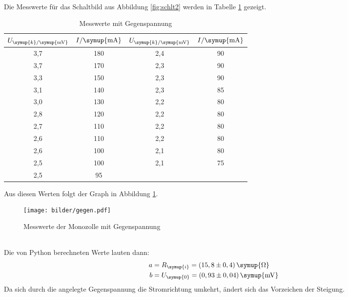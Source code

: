 \newpage
Die Messwerte für das Schaltbild aus Abbildung \ref{fig:schlt2} werden in
Tabelle \ref{tab:ggn} gezeigt.
\begin{table}[H]
  \centering
  \begin{tabular}{c c c c}
    \toprule
    $U_{\symup{k}/\symup{\si{\milli\volt}}}$ & $I/\symup{\si{\milli\ampere}}$  &
    $U_{\symup{k}/\symup{\si{\milli\volt}}}$ & $I/\symup{\si{\milli\ampere}}$  \\
    \midrule
    3,7  &  180  &  2,4  &  90  \\
    3,7  &  170  &  2,3  &  90  \\
    3,3  &  150  &  2,3  &  90  \\
    3,1  &  140  &  2,3  &  85  \\
    3,0  &  130  &  2,2  &  80  \\
    2,8  &  120  &  2,2  &  80  \\
    2,7  &  110  &  2,2  &  80  \\
    2,6  &  110  &  2,2  &  80  \\
    2,6  &  100  &  2,1  &  80  \\
    2,5  &  100  &  2,1  &  75  \\
    2,5  &   95  &  \hrulefill  &  \hrulefill \\
    \bottomrule
  \end{tabular}
  \caption{Messwerte mit Gegenspannung}
  \label{tab:ggn}
\end{table}
Aus diesen Werten folgt der Graph in Abbildung \ref{fig:ggn}.
\begin{figure}
  \centering
  \texttt{[image: bilder/gegen.pdf]}
  \caption{Messwerte der Monozolle mit Gegenspannung}
  \label{fig:ggn}
\end{figure}
\\
Die von Python berechneten Werte lauten dann:
\begin{align*}
   a &= R_\symup{i} = (15,8 \pm 0,4)\, \symup{\si{\ohm}} \\ %
   b &= U_\symup{0} = (0,93 \pm 0,04)\,\symup{\si{\milli\volt}}
\end{align*}
Da sich durch die angelegte Gegenspannung die Stromrichtung umkehrt, ändert sich
das Vorzeichen der Steigung.
